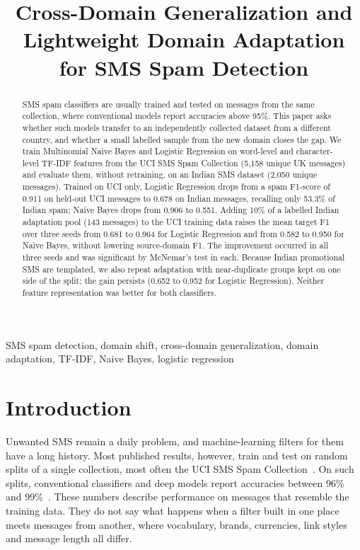 \documentclass[conference]{IEEEtran}
\begin{document}
\title{\textbf{Cross-Domain Generalization and Lightweight Domain Adaptation for SMS Spam Detection}}



\begin{abstract}
SMS spam classifiers are usually trained and tested on messages from the same collection, where conventional models report accuracies above 95\%. This paper asks whether such models transfer to an independently collected dataset from a different country, and whether a small labelled sample from the new domain closes the gap. We train Multinomial Naive Bayes and Logistic Regression on word-level and character-level TF-IDF features from the UCI SMS Spam Collection (5,158 unique UK messages) and evaluate them, without retraining, on an Indian SMS dataset (2,050 unique messages). Trained on UCI only, Logistic Regression drops from a spam F1-score of 0.911 on held-out UCI messages to 0.678 on Indian messages, recalling only 53.3\% of Indian spam; Naive Bayes drops from 0.906 to 0.551. Adding 10\% of a labelled Indian adaptation pool (143 messages) to the UCI training data raises the mean target F1 over three seeds from 0.681 to 0.964 for Logistic Regression and from 0.582 to 0.950 for Naive Bayes, without lowering source-domain F1. The improvement occurred in all three seeds and was significant by McNemar's test in each. Because Indian promotional SMS are templated, we also repeat adaptation with near-duplicate groups kept on one side of the split; the gain persists (0.652 to 0.952 for Logistic Regression). Neither feature representation was better for both classifiers.
\end{abstract}

\begin{IEEEkeywords}
SMS spam detection, domain shift, cross-domain generalization, domain adaptation, TF-IDF, Naive Bayes, logistic regression
\end{IEEEkeywords}

\section{Introduction}
Unwanted SMS remain a daily problem, and machine-learning filters for them have a long history. Most published results, however, train and test on random splits of a single collection, most often the UCI SMS Spam Collection~\cite{almeida2011}. On such splits, conventional classifiers and deep models report accuracies between 96\% and 99\%~\cite{almeida2013,roy2020}. These numbers describe performance on messages that resemble the training data. They do not say what happens when a filter built in one place meets messages from another, where vocabulary, brands, currencies, link styles and message length all differ.
\end{document}

